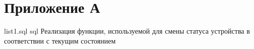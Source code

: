 \chapter*{Приложение А}

{list1.sql}
{sql}
{Реализация функции, используемой для смены статуса устройства в соответствии с текущим состоянием}
